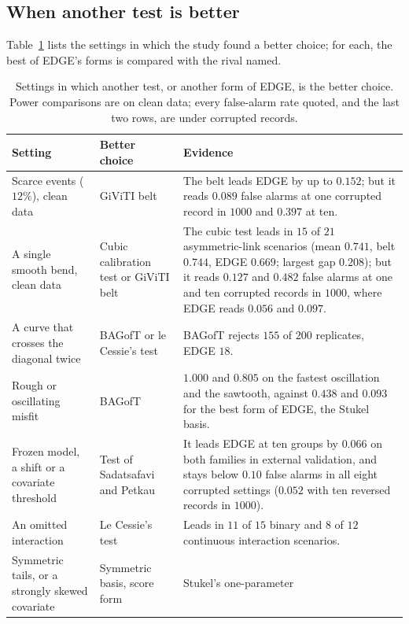 \subsection{When another test is better}\label{sec:whennot}

Table~\ref{tab:whennot} lists the settings in which the study found a better choice; for each, the
best of EDGE's forms is compared with the rival named.

\begin{table}[htbp]\centering
\caption{Settings in which another test, or another form of EDGE, is the better choice.
Power comparisons are on clean data; every false-alarm rate quoted, and the last two rows, are under
corrupted records.}
\label{tab:whennot}
\small
\begin{tabular}{>{\raggedright\arraybackslash}p{}>{\raggedright\arraybackslash}p{}>{\raggedright\arraybackslash}p{}}\toprule
Setting & Better choice & Evidence \\ \midrule
Scarce events ($12\%$), clean data & GiViTI belt & The belt leads EDGE by up to $0.152$;
but it reads $0.089$ false alarms at one corrupted record in $1000$ and $0.397$ at ten. \\
A single smooth bend, clean data & Cubic calibration test or GiViTI belt & The cubic test leads in $15$
of $21$ asymmetric-link scenarios (mean $0.741$, belt $0.744$, EDGE $0.669$; largest gap $0.208$); but it
reads $0.127$
and $0.482$ false alarms at one and ten corrupted records in $1000$, where EDGE reads $0.056$ and
$0.097$. \\
A curve that crosses the diagonal twice & BAGofT or le Cessie's test & BAGofT rejects $155$ of $200$
replicates, EDGE $18$. \\
Rough or oscillating misfit & BAGofT & $1.000$ and $0.805$ on the fastest oscillation and the sawtooth,
against $0.438$ and $0.093$ for the best form of EDGE, the Stukel basis. \\
Frozen model, a shift or a covariate threshold & Test of Sadatsafavi and Petkau & It leads EDGE at ten
groups by $0.066$ on both families in external validation, and stays below $0.10$ false alarms in all
eight corrupted settings ($0.052$ with ten reversed records in $1000$). \\
An omitted interaction & Le Cessie's test & Leads in $11$ of $15$ binary and $8$ of $12$ continuous
interaction scenarios. \\
Symmetric tails, or a strongly skewed covariate & Symmetric basis, score form & Stukel's one-parameter

\end{tabular}
\end{table}
